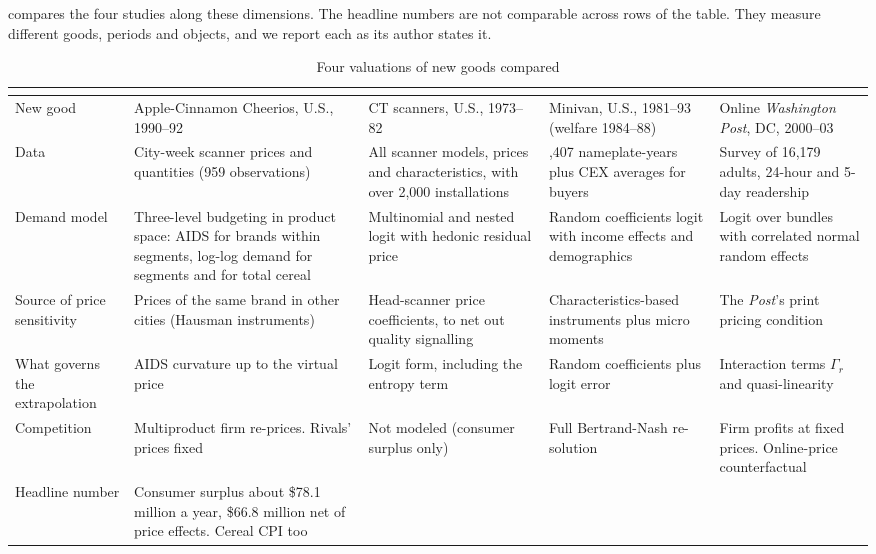  compares the four studies along these dimensions. The headline numbers are not comparable
across rows of the table. They measure different goods, periods and objects, and we report each as its author states it.

\begin{table}[htbp]
\centering
\caption{Four valuations of new goods compared}\label{tab:10-synthesis}
\footnotesize
\renewcommand{\arraystretch}{1.15}
\begin{tabularx}{\textwidth}{@{}>{\raggedright\arraybackslash}p{2.05cm}
  >{\raggedright\arraybackslash}X >{\raggedright\arraybackslash}X
  >{\raggedright\arraybackslash}X >{\raggedright\arraybackslash}X@{}}
\toprule
 & \citet{Hausman1997} & \citet{Trajtenberg1989} & \citet{Petrin2002} & \citet{Gentzkow2007} \\
\midrule
New good & Apple-Cinnamon Cheerios, U.S., 1990--92 & CT scanners, U.S., 1973--82 & Minivan, U.S., 1981--93
  (welfare 1984--88) & Online \textit{Washington Post}, DC, 2000--03 \\
Data & City-week scanner prices and quantities (959 observations) & All scanner models, prices and characteristics,
  with over 2,000 installations & 2,407 nameplate-years plus CEX averages for buyers & Survey of 16,179 adults,
  24-hour and 5-day readership \\
Demand model & Three-level budgeting in product space: AIDS for brands within segments, log-log demand for segments
  and for total cereal & Multinomial and nested logit with hedonic residual price & Random
  coefficients logit with income effects and demographics & Logit over bundles with correlated normal random effects \\
Source of price sensitivity & Prices of the same brand in other cities (Hausman instruments) & Head-scanner price
  coefficients, to net out quality signalling & Characteristics-based instruments plus micro moments & The
  \textit{Post}'s print pricing condition \\
What governs the extrapolation & AIDS curvature up to the virtual price & Logit form, including the entropy term &
  Random coefficients plus logit error & Interaction terms $\Gamma_r$ and quasi-linearity \\
Competition & Multiproduct firm re-prices. Rivals' prices fixed & Not modeled (consumer surplus only) & Full
  Bertrand-Nash re-solution & Firm profits at fixed prices. Online-price counterfactual \\
Headline number & Consumer surplus about \$78.1 million a year, \$66.8 million net of price effects. Cereal CPI too

\end{tabularx}
\end{table}
